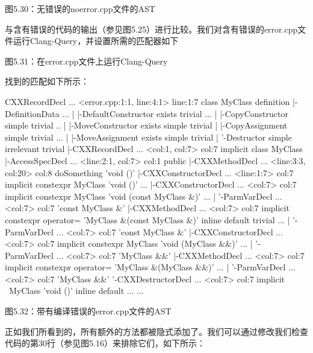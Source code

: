 \begin{center}
图5.30：无错误的noerror.cpp文件的AST
\end{center}

与含有错误的代码的输出（参见图5.25）进行比较。我们对含有错误的error.cpp文件运行Clang-Query，并设置所需的匹配器如下


\begin{center}
图5.31：在error.cpp文件上运行Clang-Query
\end{center}

找到的匹配如下所示：

\begin{shell}
CXXRecordDecl ... <error.cpp:1:1, line:4:1> line:1:7 class MyClass
definition
|-DefinitionData ...
| |-DefaultConstructor exists trivial ...
| |-CopyConstructor simple trivial ..
| |-MoveConstructor exists simple trivial
| |-CopyAssignment simple trivial ...
| |-MoveAssignment exists simple trivial
| '-Destructor simple irrelevant trivial
|-CXXRecordDecl ... <col:1, col:7> col:7 implicit class MyClass
|-AccessSpecDecl ... <line:2:1, col:7> col:1 public
|-CXXMethodDecl ... <line:3:3, col:20> col:8 doSomething 'void ()'
|-CXXConstructorDecl ... <line:1:7> col:7 implicit constexpr MyClass
'void ()' ...
|-CXXConstructorDecl ... <col:7> col:7 implicit constexpr MyClass
'void (const MyClass &)' ...
| '-ParmVarDecl ... <col:7> col:7 'const MyClass &'
|-CXXMethodDecl ... <col:7> col:7 implicit constexpr operator= 'MyClass
&(const MyClass &)' inline default trivial ...
| '-ParmVarDecl ... <col:7> col:7 'const MyClass &'
|-CXXConstructorDecl ... <col:7> col:7 implicit constexpr MyClass 'void
(MyClass &&)' ...
| '-ParmVarDecl ... <col:7> col:7 'MyClass &&'
|-CXXMethodDecl ... <col:7> col:7 implicit constexpr operator= 'MyClass
&(MyClass &&)' ...
| '-ParmVarDecl ... <col:7> col:7 'MyClass &&'
'-CXXDestructorDecl ... <col:7> col:7 implicit ~MyClass 'void ()' inline
default ...
...
\end{shell}

\begin{center}
图5.32：带有编译错误的error.cpp文件的AST
\end{center}

正如我们所看到的，所有额外的方法都被隐式添加了。我们可以通过修改我们检查代码的第30行（参见图5.16）来排除它们，如下所示：

